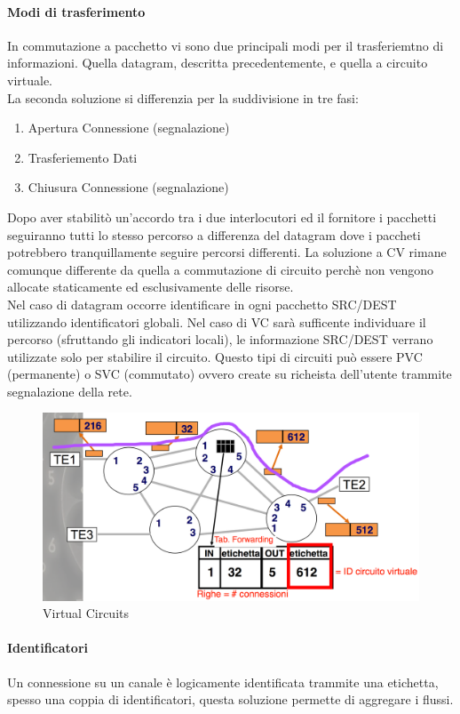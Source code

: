 \documentclass[12pt]{article}
\begin{document}
\paragraph{Modi di trasferimento}
In commutazione a pacchetto vi sono due principali modi per il trasferiemtno di informazioni. Quella datagram, descritta precedentemente, e quella a circuito virtuale.\\
La seconda soluzione si differenzia per la suddivisione in tre fasi:
\begin{enumerate}
  \item Apertura Connessione (segnalazione)
  \item Trasferiemento Dati
  \item Chiusura Connessione (segnalazione)
\end{enumerate}
Dopo aver stabilitò un'accordo tra i due interlocutori ed il fornitore i pacchetti seguiranno tutti lo stesso percorso a differenza del datagram dove i paccheti potrebbero tranquillamente seguire percorsi differenti. La soluzione a CV rimane comunque differente da quella a commutazione di circuito perchè non vengono allocate staticamente ed esclusivamente delle risorse.\\
Nel caso di datagram occorre identificare in ogni pacchetto SRC/DEST utilizzando identificatori globali. Nel caso di VC sarà sufficente individuare il percorso (sfruttando gli indicatori locali), le informazione SRC/DEST verrano utilizzate solo per stabilire il circuito. Questo tipi di circuiti può essere PVC (permanente) o SVC (commutato) ovvero create su richeista dell'utente trammite segnalazione della rete.
\begin{figure}[h!]
  \includegraphics[width=\linewidth]{images/vc.png}
  \caption{Virtual Circuits}
  \label{fig:vc}
\end{figure} %

\paragraph{Identificatori}
Un connessione su un canale è logicamente identificata trammite una etichetta, spesso una coppia di identificatori, questa soluzione permette di aggregare i flussi.\\
\end{document}
